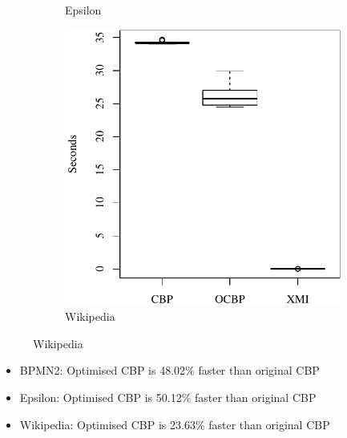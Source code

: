 \documentclass{beamer}
\begin{document}
\begin{frame}[fragile]
\begin{figure}[ht]
\begin{subfigure}{0.325\textwidth}
        \caption{Epsilon}
        \label{fig:load_time_epsilon}
    \end{subfigure}
    \hfill
    \begin{subfigure}{0.325\textwidth}
        \centering
        \includegraphics[width=\linewidth]{load_time_wikipedia}
        \caption{Wikipedia}
        \label{fig:load_time_wikipedia}
    \end{subfigure}
    \label{fig:loadtime}
\end{figure}
\begin{itemize}
    \item  BPMN2: Optimised CBP is 48.02\% faster than original CBP
    \item  Epsilon: Optimised CBP is 50.12\% faster than original CBP
    \item  Wikipedia: Optimised CBP is 23.63\% faster than original CBP
\end{itemize}

\end{frame}
\end{document}
